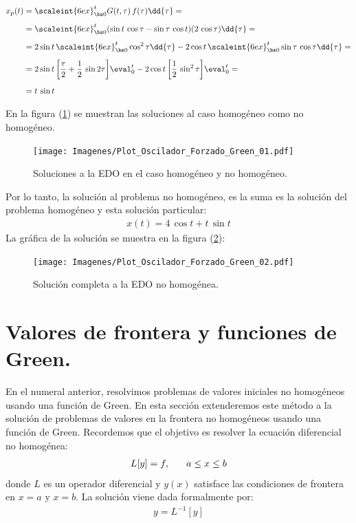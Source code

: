 \begin{ejemplo}
\begin{align}
\begin{aligned}[b]
x_{p} (t) &= \scaleint{6ex}_{\bs 0}^{t} G (t, \tau) \, f (\tau) \dd{\tau} = \\[0.5em]
&= \scaleint{6ex}_{\bs 0}^{t} (\sin t \, \cos \tau - \sin \tau \, \cos t) (2 \, \cos \tau) \dd{\tau} = \\[0.5em]
&= 2 \sin t \, \scaleint{6ex}_{\bs 0}^{t} \cos^{2} \tau \dd{\tau} - 2 \cos t \, \scaleint{6ex}_{\bs 0}^{t} \sin \tau \, \cos \tau \dd{\tau} = \\[0.5em]
&= 2 \sin t \, \bigg[ \dfrac{\tau}{2} + \dfrac{1}{2} \, \sin 2 \tau \bigg] \eval_{0}^{t} - 2 \cos t \, \bigg[ \dfrac{1}{2} \, \sin^{2} \tau \bigg] \eval_{0}^{t} = \\[0.5em]
&= t \, \sin t
\end{aligned}
\label{eq:ecuacion_07_24}
\end{align}

En la figura (\ref{fig:figura_01}) se muestran las soluciones al caso homogéneo como no homogéneo.
\begin{figure}[H]
    \centering
    \texttt{[image: Imagenes/Plot\_Oscilador\_Forzado\_Green\_01.pdf]}
    \caption{Soluciones a la EDO en el caso homogéneo y no homogéneo.}
    \label{fig:figura_01}
\end{figure}

Por lo tanto, la solución al problema no homogéneo, es la suma es la solución del problema homogéneo y esta solución particular:
\begin{align*}
x (t) = 4 \, \cos t + t \, \sin t
\end{align*}
La gráfica de la solución se muestra en la figura (\ref{fig:figura_02}):
\begin{figure}[H]
    \centering
    \texttt{[image: Imagenes/Plot\_Oscilador\_Forzado\_Green\_02.pdf]}
    \caption{Solución completa a la EDO no homogénea.}
    \label{fig:figura_02}
\end{figure}

\end{ejemplo}

\section{Valores de frontera y funciones de Green.}

En el numeral anterior, resolvimos problemas de valores iniciales no homogéneos usando una función de Green. En esta sección extenderemos este método a la solución de problemas de valores en la frontera no homogéneos usando una función de Green. Recordemos que el objetivo es resolver la ecuación diferencial no homogénea:
\begin{align*}
L [y] = f, \hspace{0.6cm} a \leq x \leq b
\end{align*}
donde $L$ es un operador diferencial y $y (x)$ satisface las condiciones de frontera en $x = a$ y $x = b$. La solución viene dada formalmente por:
\begin{align*}
y = L^{-1} [y]
\end{align*}

